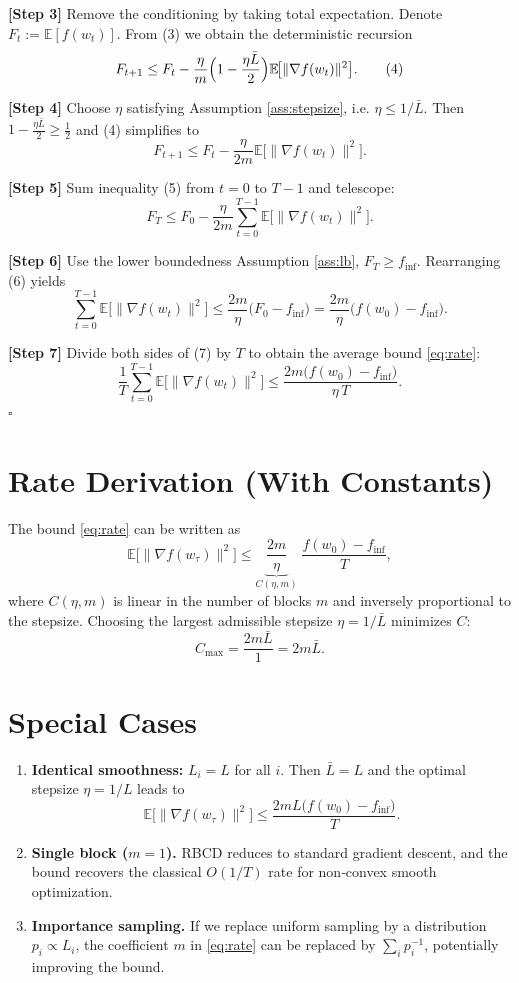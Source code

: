 \documentclass{article}
\newcommand{\E}{\mathbb{E}}
\begin{document}
\noindent\textbf{[Step 3]} Remove the conditioning by taking total expectation.
Denote $F_t:=\E[f(w_t)]$. From (3) we obtain the deterministic recursion
\[
F_{t+1}\le F_t-\frac{\eta}{m}\Bigl(1-\frac{\eta\bar L}{2}\Bigr)
   \E\!\bigl[\|\nabla f(w_t)\|^{2}\bigr].
\tag{4}
\]

\noindent\textbf{[Step 4]} Choose $\eta$ satisfying Assumption \ref{ass:stepsize},
i.e. $\eta\le 1/\bar L$. Then $1-\frac{\eta\bar L}{2}\ge\frac12$ and (4) simplifies to
\[
F_{t+1}\le F_t-\frac{\eta}{2m}
   \E\!\bigl[\|\nabla f(w_t)\|^{2}\bigr].
\tag{5}
\]

\noindent\textbf{[Step 5]} Sum inequality (5) from $t=0$ to $T-1$ and telescope:
\[
F_T\le F_0-\frac{\eta}{2m}
   \sum_{t=0}^{T-1}\E\!\bigl[\|\nabla f(w_t)\|^{2}\bigr].
\tag{6}
\]

\noindent\textbf{[Step 6]} Use the lower boundedness Assumption \ref{ass:lb},
$F_T\ge f_{\inf}$. Rearranging (6) yields
\[
\sum_{t=0}^{T-1}\E\!\bigl[\|\nabla f(w_t)\|^{2}\bigr]
\le
\frac{2m}{\eta}\bigl(F_0-f_{\inf}\bigr)
=
\frac{2m}{\eta}\bigl(f(w_0)-f_{\inf}\bigr).
\tag{7}
\]

\noindent\textbf{[Step 7]} Divide both sides of (7) by $T$ to obtain the
average bound \eqref{eq:rate}:
\[
\frac{1}{T}\sum_{t=0}^{T-1}\E\!\bigl[\|\nabla f(w_t)\|^{2}\bigr]
\le
\frac{2m\bigl(f(w_0)-f_{\inf}\bigr)}{\eta\,T}.
\]
\hfill $\square$

\section*{Rate Derivation (With Constants)}
The bound \eqref{eq:rate} can be written as
\[
\mathbb{E}\!\bigl[\|\nabla f(w_{\tau})\|^{2}\bigr]
\le
\underbrace{\frac{2m}{\eta}}_{\displaystyle C(\eta,m)}
\;\frac{f(w_0)-f_{\inf}}{T},
\]
where $C(\eta,m)$ is linear in the number of blocks $m$ and inversely
proportional to the stepsize. Choosing the largest admissible stepsize
$\eta=1/\bar L$ minimizes $C$:
\[
C_{\max}=\frac{2m\bar L}{1}=2m\bar L.
\]

\section*{Special Cases}
\begin{enumerate}
\item \textbf{Identical smoothness:} $L_i=L$ for all $i$.
    Then $\bar L=L$ and the optimal stepsize $\eta=1/L$ leads to
    \[
    \E\!\bigl[\|\nabla f(w_{\tau})\|^{2}\bigr]
    \le \frac{2mL\bigl(f(w_0)-f_{\inf}\bigr)}{T}.
    \]
\item \textbf{Single block ($m=1$).} RBCD reduces to standard gradient descent,
    and the bound recovers the classical $O(1/T)$ rate for non‑convex smooth
    optimization.
\item \textbf{Importance sampling.} If we replace uniform sampling by a
    distribution $p_i\propto L_i$, the coefficient $m$ in \eqref{eq:rate}
    can be replaced by $\sum_i p_i^{-1}$, potentially improving the bound.
\end{enumerate}
\end{document}
